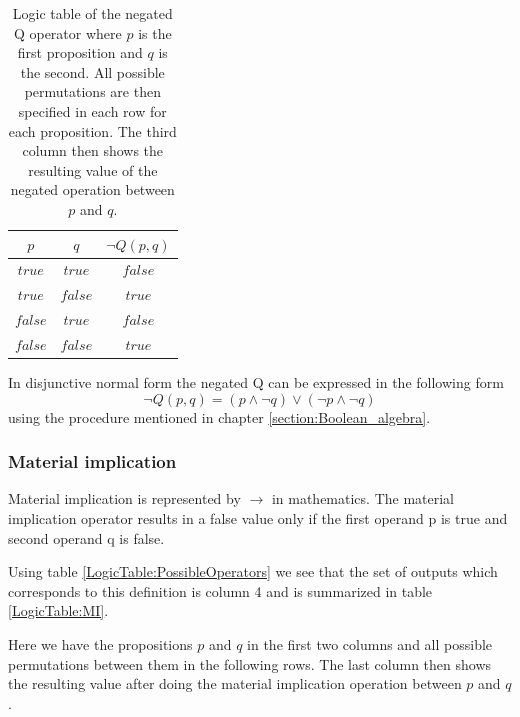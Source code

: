         \begin{table}[h!]
            \centering
            \begin{tabular}{|c|c|c|}
            	\hline
            	  $p$   &   $q$   & $\neg Q(p, q)$ \\ \hline
            	$true$  & $true$  &    $false$     \\ \hline
            	$true$  & $false$ &     $true$     \\ \hline
            	$false$ & $true$  &    $false$     \\ \hline
            	$false$ & $false$ &     $true$     \\ \hline
            \end{tabular}
            \caption{Logic table of the negated Q operator where $p$ is the first proposition and $q$ is the second. All possible permutations are then specified in each row for each proposition. The third column then shows the resulting value of the negated operation between $p$ and $q$.}
            \label{LogicTable:NOTQ}
        \end{table}
        
        In disjunctive normal form the negated Q can be expressed in the following form
        \begin{equation}
            \neg Q(p, q) = (p \wedge \neg q) \vee (\neg p \wedge \neg q)
        \end{equation}
        using the procedure mentioned in chapter \ref{section:Boolean_algebra}.
        
    \subsubsection{Material implication}
        Material implication is represented by $\rightarrow$ in mathematics. The material implication operator results in a false value only if the first operand p is true and second operand q is false.
        
        Using table \ref{LogicTable:PossibleOperators} we see that the set of outputs which corresponds to this definition is column 4 and is summarized in table \ref{LogicTable:MI}.
        
        Here we have the propositions $p$ and $q$ in the first two columns and all possible permutations between them in the following rows. The last column then shows the resulting value after doing the material implication operation between $p$ and $q$.
        
